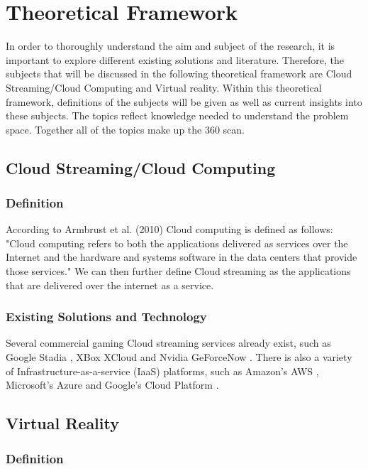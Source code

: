 \section{Theoretical Framework}

In order to thoroughly understand the aim and subject of the research, it is important to explore different existing solutions and literature. Therefore, the subjects that will be discussed in the  following theoretical framework are Cloud Streaming/Cloud Computing and Virtual reality. Within this theoretical framework, definitions of the subjects will be given as well as current insights into these subjects. The topics reflect knowledge needed to understand the problem space. Together all of the topics make up the 360 scan.

\subsection{Cloud Streaming/Cloud Computing}
\subsubsection{Definition}

According to Armbrust et al. (2010) Cloud computing is defined as follows: 
"Cloud computing refers to both the applications delivered as services over the Internet and the hardware and systems software in the data centers that provide those services." \parencite[]{aviewoncc}
We can then further define Cloud streaming as the applications that are delivered over the internet as a service.

\subsubsection{Existing Solutions and Technology}
Several commercial gaming Cloud streaming services already exist, such as Google Stadia \parencite{stadia}, XBox XCloud \parencite{xcloud} and Nvidia GeForceNow \parencite{geforcenow}. There is also a variety of Infrastructure-as-a-service (IaaS) platforms, such as Amazon's AWS \parencite{aws}, Microsoft's Azure \parencite{azure} and Google's Cloud Platform \parencite{gcp}. 

\subsection{Virtual Reality}
\subsubsection{Definition}